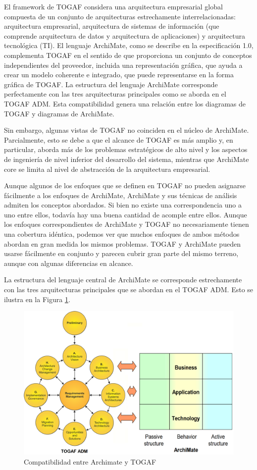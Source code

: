 El framework de TOGAF considera una arquitectura empresarial global compuesta de un conjunto de arquitecturas estrechamente interrelacionadas: arquitectura empresarial, arquitectura de sistemas de información (que comprende arquitectura de datos y arquitectura de aplicaciones) y arquitectura tecnológica (TI). El lenguaje ArchiMate, como se describe en la especificación 1.0, complementa TOGAF en el sentido de que proporciona un conjunto de conceptos independientes del proveedor, incluida una representación gráfica, que ayuda a crear un modelo coherente e integrado, que puede representarse en la forma gráfica de TOGAF. La estructura del lenguaje ArchiMate corresponde perfectamente con las tres arquitecturas principales como se aborda en el TOGAF ADM. Esta compatibilidad  genera una relación entre los diagramas de TOGAF y diagramas de ArchiMate.

Sin embargo, algunas vistas de TOGAF no coinciden en el núcleo de ArchiMate. Parcialmente, esto se debe a que el alcance de TOGAF es más amplio y, en particular, aborda más de los problemas estratégicos de alto nivel y los aspectos de ingeniería de nivel inferior del desarrollo del sistema, mientras que ArchiMate core se limita al nivel de abstracción de la arquitectura empresarial.

Aunque algunos de los enfoques que se definen en TOGAF no pueden asignarse fácilmente a los enfoques de ArchiMate, ArchiMate y sus técnicas de análisis admiten los conceptos abordados. Si bien no existe una correspondencia uno a uno entre ellos, todavía hay una buena cantidad de acomple entre ellos. Aunque los enfoques correspondientes de ArchiMate y TOGAF no necesariamente tienen una cobertura idéntica, podemos ver que muchos enfoques de ambos métodos abordan en gran medida los mismos problemas. TOGAF y ArchiMate pueden usarse fácilmente en conjunto y parecen cubrir gran parte del mismo terreno, aunque con algunas diferencias en alcance.

La estructura del lenguaje central de ArchiMate se corresponde estrechamente con las tres arquitecturas principales que se abordan en el TOGAF ADM. Esto se ilustra en la Figura \ref{togaf}.
\begin{figure}[h!]
	\centering
	\includegraphics[width=1\linewidth]{ARQUITECTURA/imgs/togaf}
	\caption{Compatibilidad entre Archimate y TOGAF}
	\label{togaf}
\end{figure}
